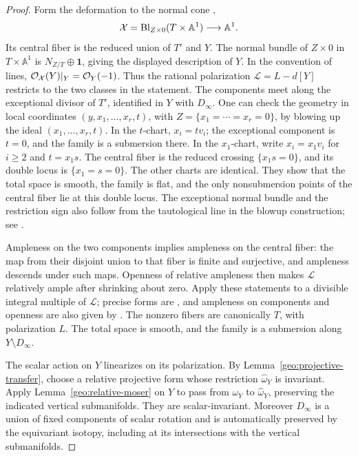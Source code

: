 \begin{proof}
Form the deformation to the normal cone
\cite[Section~5.1]{Fulton1998},
\[
 \mathcal X=\operatorname{Bl}_{Z\times0}(T\times\mathbb A^1)
 \longrightarrow\mathbb A^1.
\]
Its central fiber is the reduced union of \(T'\) and \(Y\).
The normal bundle of \(Z\times0\) in \(T\times\mathbb A^1\) is
\(N_{Z/T}\oplus\mathbf1\), giving the displayed description of
\(Y\). In the convention of lines,
\(\mathcal O_{\mathcal X}(Y)|_Y=\mathcal O_Y(-1)\).
Thus the rational polarization
\(\mathcal L=L-d[Y]\) restricts to the two classes in the
statement. The components meet along the exceptional divisor of
\(T'\), identified in \(Y\) with \(D_\infty\).
One can check the geometry in local coordinates
\((y,x_1,\ldots,x_r,t)\), with \(Z=\{x_1=\cdots=x_r=0\}\),
by blowing up the ideal \((x_1,\ldots,x_r,t)\).
In the \(t\)-chart, \(x_i=tv_i\); the exceptional component is
\(t=0\), and the family is a submersion there.
In the \(x_1\)-chart, write \(x_i=x_1v_i\) for \(i\ge2\)
and \(t=x_1s\). The central fiber is the reduced crossing
\(\{x_1s=0\}\), and its double locus is \(\{x_1=s=0\}\).
The other charts are identical. They show that the total space
is smooth, the family is flat, and the only nonsubmersion points
of the central fiber lie at this double locus.
The exceptional normal bundle and the restriction sign also
follow from the tautological line in the blowup construction;
see \cite[Tags~01OF, 02OS, and~0807]{Stacks}.

Ampleness on the two components implies ampleness on the central
fiber: the map from their disjoint union to that fiber is finite
and surjective, and ampleness descends under such maps.
Openness of relative ampleness then makes \(\mathcal L\) relatively
ample after shrinking about zero. Apply these statements to a
divisible integral multiple of \(\mathcal L\); precise forms are
\cite[Tags~0B5V and~0D2N]{Stacks}, and ampleness on components
and openness are also given by
\cite[Proposition~1.2.16 and Theorem~1.2.17]{Lazarsfeld2004}.
The nonzero fibers are canonically \(T\), with polarization \(L\).
The total space is smooth, and the family is a submersion along
\(Y\setminus D_\infty\).

The scalar action on \(Y\) linearizes on its polarization. By
Lemma~\ref{geo:projective-transfer}, choose a relative projective
form whose restriction \(\widehat\omega_Y\) is invariant.
Apply Lemma~\ref{geo:relative-moser} on \(Y\) to pass from
\(\omega_Y\) to \(\widehat\omega_Y\), preserving the indicated
vertical submanifolds. They are scalar-invariant. Moreover
\(D_\infty\) is a union of fixed components of scalar rotation and is
automatically preserved by the equivariant isotopy, including
at its intersections with the vertical submanifolds.


\end{proof}
